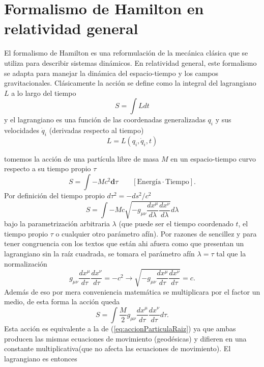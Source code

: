 \chapter{Formalismo de Hamilton en relatividad general}
\label{chap:hamilton}
El formalismo de Hamilton es una reformulación de la mecánica clásica que se utiliza para describir sistemas dinámicos. En relatividad general, este formalismo se adapta para manejar la dinámica del espacio-tiempo y los campos gravitacionales. 
Clásicamente la acción se define como la integral del lagrangiano $L$ a lo largo del tiempo
\[
S = \int L dt
\]  
y el lagrangiano es una función de las coordenadas generalizadas $q_i$ y sus velocidades $\dot{q}_i$ (derivadas respecto al tiempo)
\[
L = L(q_i, \dot{q}_i, t)
\]

tomemos la acción de una partícula libre de masa $M$ en un espacio-tiempo curvo respecto a su tiempo propio $\tau$
\begin{equation}
    S = \int -Mc^2 \mathbf{d}\tau  \qquad [\text{Energía} \cdot  \text{Tiempo}]. 
\end{equation}
Por definición del tiempo propio $d\tau^2 = -ds^2/c^2$
\begin{equation}
    S = \int -Mc \sqrt{-g_{\mu \nu} \frac{dx^\mu}{d\lambda} \frac{dx^\nu}{d\lambda}} d\lambda
    \label{eq:accionParticulaRaiz}
\end{equation} 
bajo la parametrización arbitraria $\lambda$ (que puede ser el tiempo coordenado $t$, el tiempo propio $\tau$ o cualquier otro parámetro afín).
Por razones de sencillez y para tener congruencia con los textos que están ahi afuera como \cite[p. 45]{wald-1984} que presentan un lagrangiano sin la raíz cuadrada, se tomara el parámetro afín $\lambda = \tau$ tal que la normalización
\begin{equation}
    g_{\mu \nu} \frac{dx^\mu}{d\tau} \frac{dx^\nu}{d\tau} = -c^2 \rightarrow \sqrt{-g_{\mu \nu} \frac{dx^\mu}{d\tau} \frac{dx^\nu}{d\tau}} = c.
\end{equation}
Además de eso por mera conveniencia matemática se multiplicara por el factor un medio, de esta forma la acción queda
\begin{equation}
    S  =  \int \frac{M}{2}  g_{\mu \nu} \frac{dx^\mu}{d\tau} \frac{dx^\nu}{d\tau} d\tau.
\end{equation}
Esta acción es equivalente a la de (\ref{eq:accionParticulaRaiz}) ya que ambas producen las mismas ecuaciones de movimiento (geodésicas) y difieren en una constante multiplicativa(que no afecta las ecuaciones de movimiento).
El lagrangiano es entonces
